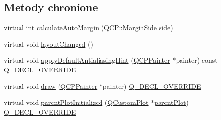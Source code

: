 \subsection*{Metody chronione}
\begin{DoxyCompactItemize}
\item 
virtual int \hyperlink{class_q_c_p_layout_element_a005c9f0fe84bc1591a2cf2c46fd477b4}{calculate\+Auto\+Margin} (\hyperlink{namespace_q_c_p_a7e487e3e2ccb62ab7771065bab7cae54}{Q\+C\+P\+::\+Margin\+Side} side)
\item 
virtual void \hyperlink{class_q_c_p_layout_element_a765f041a73af0c2de41b41a5a03e31a4}{layout\+Changed} ()
\item 
virtual void \hyperlink{class_q_c_p_layout_element_a0a8f18141bcf46cf40ad4c13324ff346}{apply\+Default\+Antialiasing\+Hint} (\hyperlink{class_q_c_p_painter}{Q\+C\+P\+Painter} $\ast$painter) const \hyperlink{qcustomplot_8hh_a42cc5eaeb25b85f8b52d2a4b94c56f55}{Q\+\_\+\+D\+E\+C\+L\+\_\+\+O\+V\+E\+R\+R\+I\+DE}
\item 
virtual void \hyperlink{class_q_c_p_layout_element_ad1c597b1d608cfdd86e7b76819a94cfb}{draw} (\hyperlink{class_q_c_p_painter}{Q\+C\+P\+Painter} $\ast$painter) \hyperlink{qcustomplot_8hh_a42cc5eaeb25b85f8b52d2a4b94c56f55}{Q\+\_\+\+D\+E\+C\+L\+\_\+\+O\+V\+E\+R\+R\+I\+DE}
\item 
virtual void \hyperlink{class_q_c_p_layout_element_ab4bb5c5a958451f5f153fdce350f13cf}{parent\+Plot\+Initialized} (\hyperlink{class_q_custom_plot}{Q\+Custom\+Plot} $\ast$\hyperlink{class_q_c_p_layerable_ab7e0e94461566093d36ffc0f5312b109}{parent\+Plot}) \hyperlink{qcustomplot_8hh_a42cc5eaeb25b85f8b52d2a4b94c56f55}{Q\+\_\+\+D\+E\+C\+L\+\_\+\+O\+V\+E\+R\+R\+I\+DE}
\end{DoxyCompactItemize}
